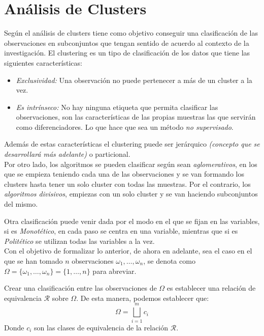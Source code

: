 \section{Análisis de Clusters}
\noindent Según \cite{Jain 1988} el análisis de clusters tiene como objetivo conseguir una clasificación de las observaciones en subconjuntos que tengan sentido de acuerdo al contexto de la investigación. El clustering es un tipo de clasificación de los datos que tiene las siguientes características:
\begin{itemize}
\item \textit{Exclusividad: }Una observación no puede pertenecer a más de un cluster a la vez. 
\item \textit{Es intrínseco: }No hay ninguna etiqueta que permita clasificar las observaciones, son las características de las propias muestras las que servirán como diferenciadores. Lo que hace que sea un método \textit{no supervisado}.
\end{itemize}
Además de estas características el clustering puede ser jerárquico \textit{(concepto que se desarrollará más adelante)} o particional. \\
\noindent Por otro lado, los algoritmos se pueden clasificar según  sean \textit{aglomerativos}, en los que se empieza teniendo cada una de las observaciones y se van formando los clusters hasta tener un solo cluster con todas las muestras. Por el contrario, los \textit{algoritmos   divisivos}, empiezas con un solo cluster y se van haciendo subconjuntos del mismo.  

\noindent Otra clasificación puede venir dada por el modo en el que se fijan en las variables, si es \textit{Monotético}, en cada paso se centra en una variable, mientras que si es \textit{Politético} se utilizan todas las variables a la vez.\\



\noindent Con el objetivo de formalizar lo anterior, de ahora en adelante, sea el caso en el que se han tomado $n$ observaciones $\omega_1,\ldots, \omega_n$, se denota como $\Omega=\lbrace\omega_1,\ldots, \omega_n\rbrace=\lbrace 1,\ldots, n\rbrace$ para abreviar. 

\noindent Crear una clasificación entre las observaciones de $\Omega$ es establecer una relación de equivalencia $\mathcal{R}$ sobre $\Omega$. De esta manera, podemos establecer que:
\begin{equation}
\Omega=\bigsqcup_{i=1}^m c_i
\end{equation}
\noindent Donde $c_i$ son las clases de equivalencia de la relación $\mathcal{R}$.

